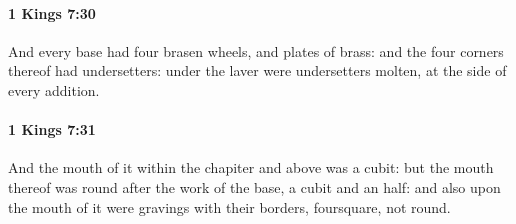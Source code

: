 		\paragraph{1 Kings 7:30} %
			\label{1KINGS-7-30}

			And every base had four brasen wheels, and plates of brass: and the four corners thereof had undersetters: under the laver were undersetters molten, at the side of every addition.


		\paragraph{1 Kings 7:31} %
			\label{1KINGS-7-31}

			And the mouth of it within the chapiter and above was a cubit: but the mouth thereof was round after the work of the base, a cubit and an half: and also upon the mouth of it were gravings with their borders, foursquare, not round.

